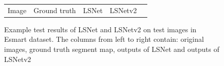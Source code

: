 \documentclass[journal]{IEEEtran}
\begin{document}
\begin{figure}
\begin{tabularx}{\textwidth}{ccccc}

  Image & Ground truth & LSNet & LSNetv2
  \end{tabularx}
  \caption{\label{esmart_example_0}Example test results of LSNet and LSNetv2 on test images in Esmart dataset. The columns from left to right contain: original images, ground truth segment map, outputs of LSNet and outputs of LSNetv2}
\end{figure}
\end{document}

